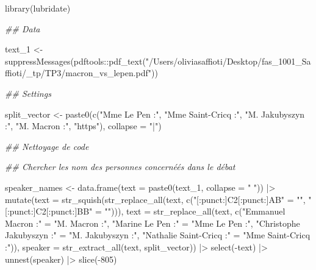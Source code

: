 \documentclass[
  letterpaper,
  DIV=11,
  numbers=noendperiod]{scrartcl}
\newenvironment{Shaded}{\begin{snugshade}}{\end{snugshade}}
\newcommand{\AttributeTok}[1]{\textcolor[rgb]{0.40,0.45,0.13}{#1}}
\newcommand{\DecValTok}[1]{\textcolor[rgb]{0.68,0.00,0.00}{#1}}
\newcommand{\DocumentationTok}[1]{\textcolor[rgb]{0.37,0.37,0.37}{\textit{#1}}}
\newcommand{\FunctionTok}[1]{\textcolor[rgb]{0.28,0.35,0.67}{#1}}
\newcommand{\NormalTok}[1]{\textcolor[rgb]{0.00,0.23,0.31}{#1}}
\newcommand{\OtherTok}[1]{\textcolor[rgb]{0.00,0.23,0.31}{#1}}
\newcommand{\SpecialCharTok}[1]{\textcolor[rgb]{0.37,0.37,0.37}{#1}}
\newcommand{\StringTok}[1]{\textcolor[rgb]{0.13,0.47,0.30}{#1}}
\begin{document}
\begin{Shaded}
\begin{Highlighting}[]
\FunctionTok{library}\NormalTok{(lubridate)}

\DocumentationTok{\#\# Data}

\NormalTok{text\_1 }\OtherTok{\textless{}{-}} \FunctionTok{suppressMessages}\NormalTok{(pdftools}\SpecialCharTok{::}\FunctionTok{pdf\_text}\NormalTok{(}\StringTok{"/Users/oliviasaffioti/Desktop/fas\_1001\_Saffioti/\_tp/TP3/macron\_vs\_lepen.pdf"}\NormalTok{))}

\DocumentationTok{\#\# Settings}

\NormalTok{split\_vector }\OtherTok{\textless{}{-}} \FunctionTok{paste0}\NormalTok{(}\FunctionTok{c}\NormalTok{(}\StringTok{"Mme Le Pen :"}\NormalTok{, }\StringTok{"Mme Saint{-}Cricq :"}\NormalTok{, }\StringTok{"M. Jakubyszyn :"}\NormalTok{, }\StringTok{"M. Macron :"}\NormalTok{, }\StringTok{"https"}\NormalTok{), }\AttributeTok{collapse =} \StringTok{"|"}\NormalTok{)}


\DocumentationTok{\#\# Nettoyage de code}

\DocumentationTok{\#\# Chercher les nom des personnes concernéés dans le débat}

\NormalTok{speaker\_names }\OtherTok{\textless{}{-}} \FunctionTok{data.frame}\NormalTok{(}\AttributeTok{text =} \FunctionTok{paste0}\NormalTok{(text\_1, }\AttributeTok{collapse =} \StringTok{" "}\NormalTok{)) }\SpecialCharTok{|\textgreater{}}
  \FunctionTok{mutate}\NormalTok{(}\AttributeTok{text =} \FunctionTok{str\_squish}\NormalTok{(}\FunctionTok{str\_replace\_all}\NormalTok{(text, }\FunctionTok{c}\NormalTok{(}\StringTok{"[:punct:]C2[:punct:]AB"}  \OtherTok{=} \StringTok{""}\NormalTok{,}
                                                   \StringTok{"[:punct:]C2[:punct:]BB"}  \OtherTok{=} \StringTok{""}\NormalTok{))),}
         \AttributeTok{text =} \FunctionTok{str\_replace\_all}\NormalTok{(text, }\FunctionTok{c}\NormalTok{(}\StringTok{"Emmanuel Macron :"}       \OtherTok{=} \StringTok{"M. Macron :"}\NormalTok{,}
                                        \StringTok{"Marine Le Pen :"}         \OtherTok{=} \StringTok{"Mme Le Pen :"}\NormalTok{,}
                                        \StringTok{"Christophe Jakubyszyn :"} \OtherTok{=} \StringTok{"M. Jakubyszyn :"}\NormalTok{,}
                                        \StringTok{"Nathalie Saint{-}Cricq :"}  \OtherTok{=} \StringTok{"Mme Saint{-}Cricq :"}\NormalTok{)),}
         \AttributeTok{speaker =} \FunctionTok{str\_extract\_all}\NormalTok{(text, split\_vector)) }\SpecialCharTok{|\textgreater{}} 
  \FunctionTok{select}\NormalTok{(}\SpecialCharTok{{-}}\NormalTok{text) }\SpecialCharTok{|\textgreater{}} 
  \FunctionTok{unnest}\NormalTok{(speaker) }\SpecialCharTok{|\textgreater{}} 
  \FunctionTok{slice}\NormalTok{(}\SpecialCharTok{{-}}\DecValTok{805}\NormalTok{)}
  

\end{Highlighting}
\end{Shaded}
\end{document}
